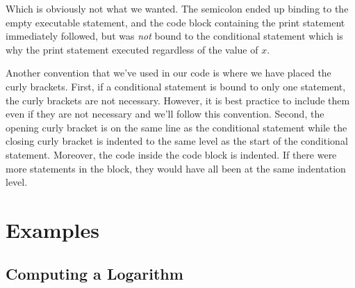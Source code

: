 Which is obviously not what we wanted.  The semicolon ended up binding 
to the empty executable statement, and the code block containing the
print statement immediately followed, but was \emph{not} bound to the
conditional statement which is why the print statement executed regardless
of the value of $x$.

Another convention that we've used in our code is where we have placed the
curly brackets.  First, if a conditional statement is bound to only one statement, 
the curly brackets are not necessary.  However, it is best practice to include them
even if they are not necessary and we'll follow this convention.  Second, the
opening curly bracket is on the same line as the conditional statement while
the closing curly bracket is indented to the same level as the start of the
conditional statement.  Moreover, the code inside the code block is indented.
If there were more statements in the block, they would have all been at the
same indentation level.

%
%
%
%

\section{Examples}

\subsection{Computing a Logarithm}

